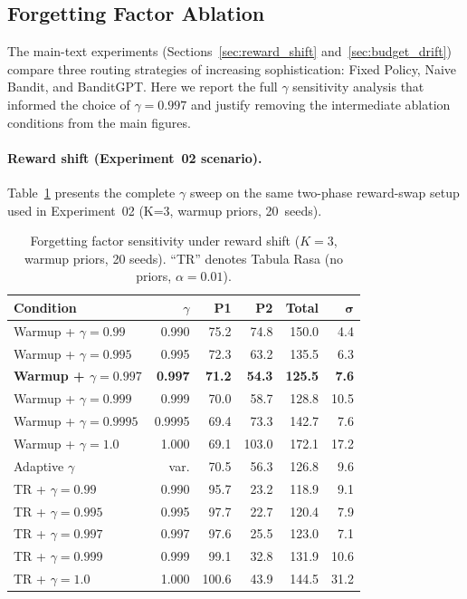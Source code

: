 
\subsection{Forgetting Factor Ablation}
\label{app:forgetting_ablation}

The main-text experiments (Sections~\ref{sec:reward_shift}
and~\ref{sec:budget_drift}) compare three routing strategies of
increasing sophistication: Fixed Policy, Naive Bandit, and
BanditGPT.
Here we report the full $\gamma$ sensitivity analysis that informed
the choice of $\gamma{=}0.997$ and justify removing the
intermediate ablation conditions from the main figures.

\paragraph{Reward shift (Experiment~02 scenario).}
Table~\ref{tab:gamma_ablation} presents the complete $\gamma$
sweep on the same two-phase reward-swap setup used in
Experiment~02 (K=3, warmup priors, 20~seeds).

\begin{table}[h]
\centering
\small
\caption{Forgetting factor sensitivity under reward shift
($K{=}3$, warmup priors, 20 seeds).  ``TR'' denotes Tabula
Rasa (no priors, $\alpha{=}0.01$).}
\label{tab:gamma_ablation}
\begin{tabular}{@{}lrrrrr@{}}
\toprule
\textbf{Condition} & \textbf{$\gamma$} &
    \textbf{P1} & \textbf{P2} & \textbf{Total} & $\boldsymbol{\sigma}$ \\
\midrule
Warmup + $\gamma{=}0.99$   & 0.990 & 75.2 & 74.8 & 150.0 &  4.4 \\
Warmup + $\gamma{=}0.995$  & 0.995 & 72.3 & 63.2 & 135.5 &  6.3 \\
\textbf{Warmup + $\gamma{=}0.997$}  & \textbf{0.997} & \textbf{71.2} & \textbf{54.3} & \textbf{125.5} &  \textbf{7.6} \\
Warmup + $\gamma{=}0.999$  & 0.999 & 70.0 & 58.7 & 128.8 & 10.5 \\
Warmup + $\gamma{=}0.9995$ & 0.9995& 69.4 & 73.3 & 142.7 &  7.6 \\
Warmup + $\gamma{=}1.0$    & 1.000 & 69.1 & 103.0& 172.1 & 17.2 \\
Adaptive $\gamma$           & var.  & 70.5 & 56.3 & 126.8 &  9.6 \\
\midrule
TR + $\gamma{=}0.99$       & 0.990 & 95.7 & 23.2 & 118.9 &  9.1 \\
TR + $\gamma{=}0.995$      & 0.995 & 97.7 & 22.7 & 120.4 &  7.9 \\
TR + $\gamma{=}0.997$      & 0.997 & 97.6 & 25.5 & 123.0 &  7.1 \\
TR + $\gamma{=}0.999$      & 0.999 & 99.1 & 32.8 & 131.9 & 10.6 \\
TR + $\gamma{=}1.0$        & 1.000 &100.6 & 43.9 & 144.5 & 31.2 \\
\bottomrule
\end{tabular}
\end{table}


